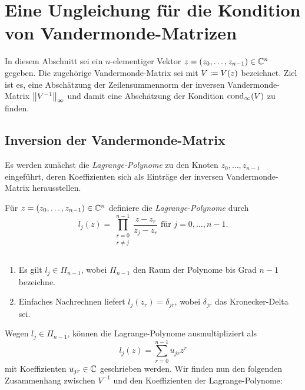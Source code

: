 \chapter{Eine Ungleichung für die Kondition von Vandermonde-Matrizen}
In diesem Abschnitt sei ein $n$-elementiger Vektor $z = (z_0, \dots, z_{n-1})
\in \Cn$ gegeben.  Die zugehörige Vandermonde-Matrix sei mit $V \defeq
\Vand{z}$ bezeichnet.  Ziel ist es, eine Abschätzung der Zeilensummennorm der
inversen Vandermonde-Matrix $\norm{V^{-1}}_{\infty}$ und damit eine Abschätzung der
Kondition $\cond[\infty]{V}$ zu finden.


\section{Inversion der Vandermonde-Matrix}
Es werden zunächst die \emph{Lagrange-Polynome} zu den Knoten
$z_0, \dots, z_{n-1}$ eingeführt, deren Koeffizienten sich als Einträge der
inversen Vandermonde-Matrix herausstellen.

\begin{mydef}
    Für $ z = (z_0, \dots, z_{n-1}) \in \Cn $ definiere die
    \emph{Lagrange-Polynome} durch
    \[
        l_j(z) = \prod_{\substack{r=0\\ r \neq j}}^{n-1} \frac{z - z_r}{z_j - z_r} \text{ für } j = 0, \dots, n-1.
    \]
\end{mydef}

\begin{remark}
    $ \; $
    \begin{enumerate}
        \item Es gilt $l_j \in \Pi_{n-1}$, wobei $\Pi_{n-1}$ den Raum der Polynome bis
        Grad $n-1$ bezeichne.
        \item  Einfaches Nachrechnen liefert
        $l_j(z_r) = \delta_{jr}$, wobei $\delta_{jr}$ das Kronecker-Delta
        sei.
    \end{enumerate}
\end{remark}

\noindent Wegen $l_j \in \Pi_{n-1}$, können die Lagrange-Polynome ausmultipliziert als
\begin{equation}
    \label{eq:lagrange}
    l_j(z) = \sum_{r = 0}^{n-1} u_{jr} z^{r}
\end{equation}
mit Koeffizienten $u_{jr} \in \C$ geschrieben werden.
Wir finden nun den folgenden Zusammenhang zwischen $V^{-1}$ und den
Koeffizienten der Lagrange-Polynome:

